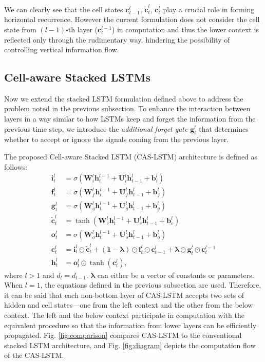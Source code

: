\documentclass[wcp]{jmlr}
\begin{document}
    We can clearly see that the cell states $\mathbf{c}_{t-1}^l$, $\tilde{\mathbf{c}}_t^l$, $\mathbf{c}_t^l$ play a crucial role in forming horizontal recurrence.
    However the current formulation does not consider the cell state from $(l-1)$-th layer ($\mathbf{c}_t^{l-1}$) in computation and thus the lower context is reflected only through the rudimentary way, hindering the possibility of controlling vertical information flow.
    
    \subsection{Cell-aware Stacked LSTMs}
    Now we extend the stacked LSTM formulation defined above to address the problem noted in the previous subsection.
    To enhance the interaction between layers in a way similar to how LSTMs keep and forget the information from the previous time step, we introduce the \textit{additional forget gate} $\mathbf{g}_t^l$ that determines whether to accept or ignore the signals coming from the previous layer.
    
    The proposed Cell-aware Stacked LSTM (CAS-LSTM) architecture is defined as follows:
    \begin{align}
    \mathbf{i}_t^l &= \sigma(\mathbf{W}_i^l \mathbf{h}_t^{l-1} + \mathbf{U}_i^l \mathbf{h}_{t-1}^l + \mathbf{b}_i^l) \\
    \mathbf{f}_t^l &= \sigma(\mathbf{W}_f^l \mathbf{h}_t^{l-1} + \mathbf{U}_f^l \mathbf{h}_{t-1}^l + \mathbf{b}_f^l) \\
    \mathbf{g}_t^l &= \sigma(\mathbf{W}_g^l \mathbf{h}_t^{l-1} + \mathbf{U}_g^l \mathbf{h}_{t-1}^l + \mathbf{b}_g^l) \label{eq:new-forget-gate}\\
    \tilde{\mathbf{c}}_t^l &= \tanh(\mathbf{W}_c^l \mathbf{h}_t^{l-1} + \mathbf{U}_c^l \mathbf{h}_{t-1}^l + \mathbf{b}_c^l) \\
    \mathbf{o}_t^l &= \sigma(\mathbf{W}_o^l \mathbf{h}_t^{l-1} + \mathbf{U}_o^l \mathbf{h}_{t-1}^l + \mathbf{b}_o^l) \\
    \mathbf{c}_t^l &= \mathbf{i}_t^l \odot {\tilde{\mathbf{c}}}_t^l + (\bm{1 - \lambda})\odot\mathbf{f}_t^l \odot \mathbf{c}_{t-1}^l + \bm{\lambda}\odot\mathbf{g}_t^l \odot \mathbf{c}_t^{l-1} \\
    \mathbf{h}_t^l &= \mathbf{o}_t^l \odot \tanh(\mathbf{c}_t^l),
    \end{align}
    where $l > 1$ and $d_l=d_{l-1}$.
    $\bm\lambda$ can either be a vector of constants or parameters.
    When $l=1$, the equations defined in the previous subsection are used.
    Therefore, it can be said that each non-bottom layer of CAS-LSTM accepts two sets of hidden and cell states---one from the left context and the other from the below context.
    The left and the below context participate in computation with the equivalent procedure so that the information from lower layers can be efficiently propagated.
    Fig. \ref{fig:comparison} compares CAS-LSTM to the conventional stacked LSTM architecture,
    and Fig. \ref{fig:diagram} depicts the computation flow of the CAS-LSTM.
    
\end{document}
